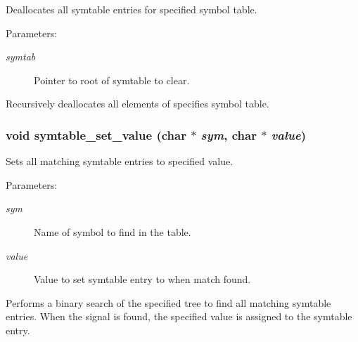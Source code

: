 Deallocates all symtable entries for specified symbol table. 

\begin{Desc}
\item[Parameters:]
\begin{description}
\item[{\em symtab}]Pointer to root of symtable to clear.\end{description}
\end{Desc}
Recursively deallocates all elements of specifies symbol table. 
\subsubsection{\setlength{\rightskip}{0pt plus 5cm}void symtable\_\-set\_\-value (char $\ast$ {\em sym}, char $\ast$ {\em value})}\label{symtable_8h_a2}


Sets all matching symtable entries to specified value. 

\begin{Desc}
\item[Parameters:]
\begin{description}
\item[{\em sym}]Name of symbol to find in the table. \item[{\em value}]Value to set symtable entry to when match found.\end{description}
\end{Desc}
Performs a binary search of the specified tree to find all matching symtable entries. When the signal is found, the specified value is assigned to the symtable entry. 